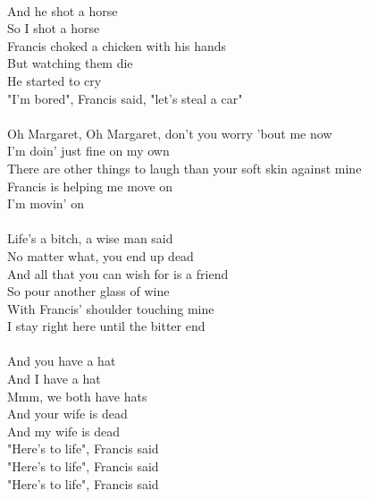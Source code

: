{\\
And he shot a horse\\
So I shot a horse\\
Francis choked a chicken with his hands\\
But watching them die\\
He started to cry\\
"I'm bored", Francis said, "let's steal a car"\\
\\
Oh Margaret, Oh Margaret, don't you worry 'bout me now\\
I'm doin' just fine on my own\\
There are other things to laugh than your soft skin against mine\\
Francis is helping me move on\\
I'm movin' on\\
\\
Life's a bitch, a wise man said\\
No matter what, you end up dead\\
And all that you can wish for is a friend\\
So pour another glass of wine\\
With Francis' shoulder touching mine\\
I stay right here until the bitter end\\
\\
And you have a hat\\
And I have a hat\\
Mmm, we both have hats\\
And your wife is dead\\
And my wife is dead\\
"Here's to life", Francis said\\
"Here's to life", Francis said\\
"Here's to life", Francis said
}


